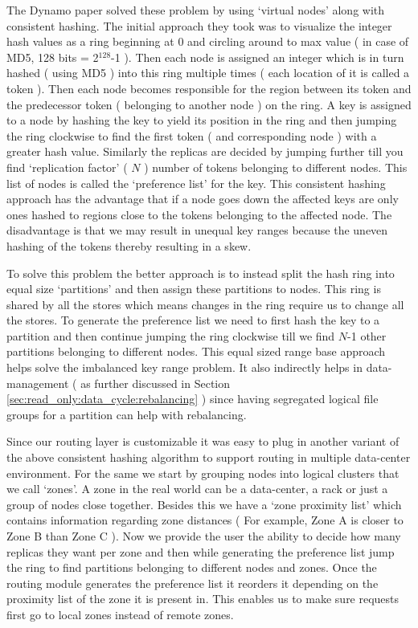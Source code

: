 \documentclass[10pt,twocolumn,preprint,natbib,authoryear]{sigplanconf}
\begin{document}
The Dynamo paper solved these problem by using `virtual nodes' along with consistent hashing. The initial approach they took was to visualize the integer hash values as a ring beginning at 0 and circling around to max value ( in case of MD5, 128 bits = 2$^{128}$-1 ). Then each node is assigned an integer which is in turn hashed ( using MD5 ) into this ring multiple times ( each location of it is called a token ). Then each node becomes responsible for the region between its token and the predecessor token ( belonging to another node ) on the ring. A key is assigned to a node by hashing the key to yield its position in the ring and then jumping the ring clockwise to find the first token ( and corresponding node ) with a greater hash value. Similarly the replicas are decided by jumping further till you find `replication factor' ( $N$ ) number of tokens belonging to different nodes. This list of nodes is called the `preference list' for the key. This consistent hashing approach has the advantage that if a node goes down the affected keys are only ones hashed to regions close to the tokens belonging to the affected node. The disadvantage is that we may result in unequal key ranges because the uneven hashing of the tokens thereby resulting in a skew. 

To solve this problem the better approach is to instead split the hash ring into equal size `partitions' and then assign these partitions to nodes. This ring is shared by all the stores which means changes in the ring require us to change all the stores. To generate the preference list we need to first hash the key to a partition and then continue jumping the ring clockwise till we find $N$-1 other partitions belonging to different nodes. This equal sized range base approach helps solve the imbalanced key range problem. It also indirectly helps in data-management ( as further discussed in Section \ref{sec:read_only:data_cycle:rebalancing} ) since having segregated logical file groups for a partition can help with rebalancing. 

Since our routing layer is customizable it was easy to plug in another variant of the above consistent hashing algorithm to support routing in multiple data-center environment. For the same we start by grouping nodes into logical clusters that we call `zones'. A zone in the real world can be a data-center, a rack or just a group of nodes close together. Besides this we have a `zone proximity list' which contains information regarding zone distances ( For example, Zone A is closer to Zone B than Zone C ). Now we provide the user the ability to decide how many replicas they want per zone and then while generating the preference list jump the ring to find partitions belonging to different nodes and zones. Once the routing module generates the preference list it reorders it depending on the proximity list of the zone it is present in. This enables us to make sure requests first go to local zones instead of remote zones. 
\end{document}
